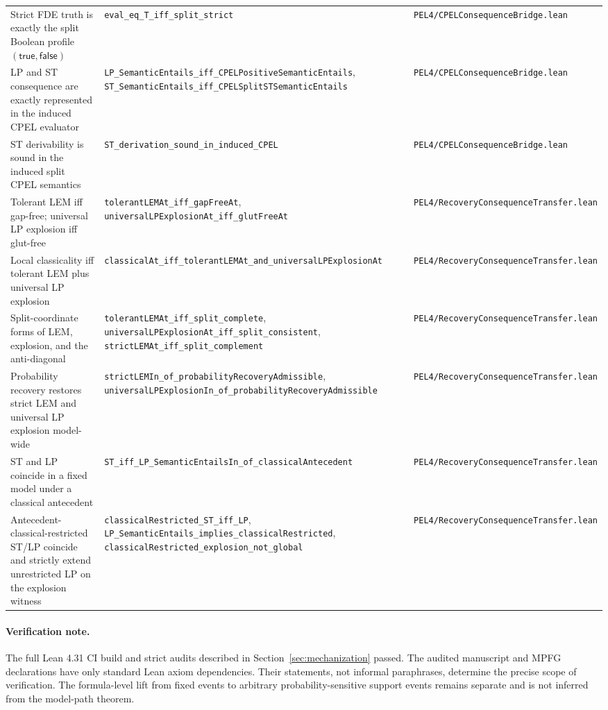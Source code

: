 \begin{longtable}{@{}p{}p{}p{}@{}}
\addlinespace
Strict FDE truth is exactly the split Boolean profile \((\mathsf{true},\mathsf{false})\) & \texttt{eval\_eq\_T\_iff\_split\_strict} & \texttt{PEL4/CPELConsequenceBridge.lean}\\
\addlinespace
LP and ST consequence are exactly represented in the induced CPEL evaluator & \texttt{LP\_SemanticEntails\_iff\_CPELPositiveSemanticEntails}, \texttt{ST\_SemanticEntails\_iff\_CPELSplitSTSemanticEntails} & \texttt{PEL4/CPELConsequenceBridge.lean}\\
\addlinespace
ST derivability is sound in the induced split CPEL semantics & \texttt{ST\_derivation\_sound\_in\_induced\_CPEL} & \texttt{PEL4/CPELConsequenceBridge.lean}\\
\addlinespace
Tolerant LEM iff gap-free; universal LP explosion iff glut-free & \texttt{tolerantLEMAt\_iff\_gapFreeAt}, \texttt{universalLPExplosionAt\_iff\_glutFreeAt} & \texttt{PEL4/RecoveryConsequenceTransfer.lean}\\
\addlinespace
Local classicality iff tolerant LEM plus universal LP explosion & \texttt{classicalAt\_iff\_tolerantLEMAt\_and\_universalLPExplosionAt} & \texttt{PEL4/RecoveryConsequenceTransfer.lean}\\
\addlinespace
Split-coordinate forms of LEM, explosion, and the anti-diagonal & \texttt{tolerantLEMAt\_iff\_split\_complete}, \texttt{universalLPExplosionAt\_iff\_split\_consistent}, \texttt{strictLEMAt\_iff\_split\_complement} & \texttt{PEL4/RecoveryConsequenceTransfer.lean}\\
\addlinespace
Probability recovery restores strict LEM and universal LP explosion model-wide & \texttt{strictLEMIn\_of\_probabilityRecoveryAdmissible}, \texttt{universalLPExplosionIn\_of\_probabilityRecoveryAdmissible} & \texttt{PEL4/RecoveryConsequenceTransfer.lean}\\
\addlinespace
ST and LP coincide in a fixed model under a classical antecedent & \texttt{ST\_iff\_LP\_SemanticEntailsIn\_of\_classicalAntecedent} & \texttt{PEL4/RecoveryConsequenceTransfer.lean}\\
\addlinespace
Antecedent-classical-restricted ST/LP coincide and strictly extend unrestricted LP on the explosion witness & \texttt{classicalRestricted\_ST\_iff\_LP}, \texttt{LP\_SemanticEntails\_implies\_classicalRestricted}, \texttt{classicalRestricted\_explosion\_not\_global} & \texttt{PEL4/RecoveryConsequenceTransfer.lean}\\
\bottomrule
\end{longtable}
\endgroup

\paragraph{Verification note.}
The full Lean 4.31 CI build and strict audits described in Section~\ref{sec:mechanization} passed. The audited manuscript and MPFG declarations have only standard Lean axiom dependencies. Their statements, not informal paraphrases, determine the precise scope of verification. The formula-level lift from fixed events to arbitrary probability-sensitive support events remains separate and is not inferred from the model-path theorem.
